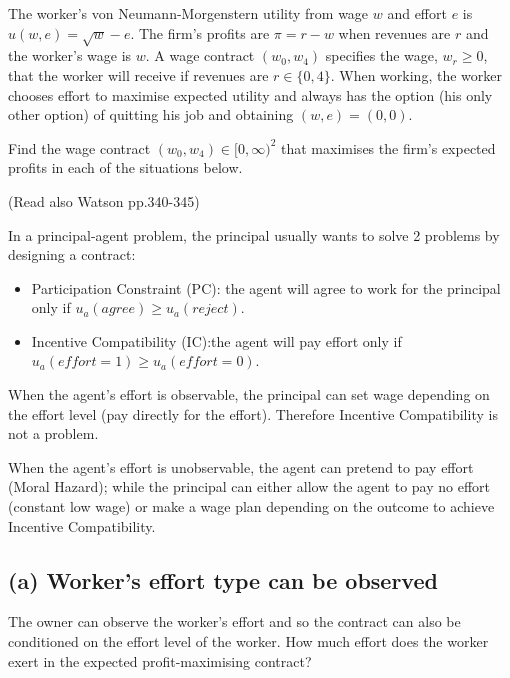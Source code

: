 \documentclass{article}
\begin{document}
The worker's von Neumann-Morgenstern utility from wage $w$ and effort $e$ is $u(w, e) = \sqrt{w} -e$.
The firm's profits are $\pi = r - w$ when revenues are $r$ and the worker's wage is $w$. A wage contract
$(w_0, w_4)$ specifies the wage, $w_r \ge 0$, that the worker will receive if revenues are $r \in \{0, 4\}$. When
working, the worker chooses effort to maximise expected utility and always has the option (his only
other option) of quitting his job and obtaining $(w, e) = (0, 0)$.

\medskip

Find the wage contract $(w_0, w_4) \in [0,\infty)^2$ that maximises the firm's expected profits in each
of the situations below.


\begin{mdframed}[backgroundcolor=blue!20,linecolor=white]
(Read also Watson pp.340-345)

In a principal-agent problem, the principal usually wants to 
solve 2 problems by designing a contract:

\begin{itemize}
\item Participation Constraint (PC): the agent will agree to work for the principal only if $u_a(agree) \ge u_a(reject)$.
\item Incentive Compatibility (IC):the agent will pay effort only if $u_a(effort=1) \ge u_a(effort=0)$.
\end{itemize}

When the agent's effort is observable, the principal can set wage depending on the effort level (pay directly for the effort). Therefore Incentive Compatibility is not a problem.

\medskip

When the agent's effort is unobservable, the agent can pretend 
to pay effort (Moral Hazard); while the principal can either allow the agent to pay no effort (constant low wage) or make a wage plan depending on the outcome to achieve Incentive Compatibility.


\end{mdframed}

\bigskip

\subsection*{(a) Worker's effort type can be observed}
The owner can observe the worker's effort and so the contract can also be conditioned
on the effort level of the worker. How much effort does the worker exert in the expected
profit-maximising contract?
\end{document}
